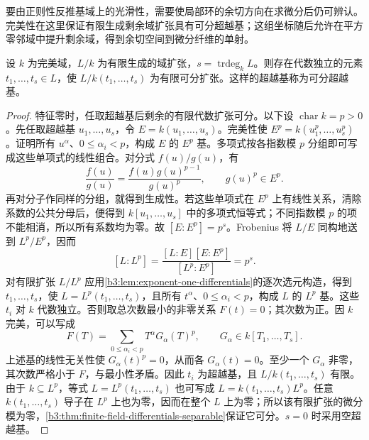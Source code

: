 要由正则性反推基域上的光滑性，需要使局部环的余切方向在求微分后仍可辨认。完美性在这里保证有限生成剩余域扩张具有可分超越基；这组坐标随后允许在平方零邻域中提升剩余域，得到余切空间到微分纤维的单射。

\begin{lemma}[可分超越基]\label{b3:lem:perfect-field-separating-basis}
	设 \(k\) 为完美域，\(L/k\) 为有限生成的域扩张，\(s=\operatorname{trdeg}_kL\)。则存在代数独立的元素 \(t_1,\ldots,t_s\in L\)，使 \(L/k(t_1,\ldots,t_s)\) 为有限可分扩张。这样的超越基称为可分超越基。
\end{lemma}
\begin{proof}
	特征零时，任取超越基后剩余的有限代数扩张可分。以下设 \(\operatorname{char}k=p>0\)。先任取超越基 \(u_1,\ldots,u_s\)，令 \(E=k(u_1,\ldots,u_s)\)。完美性使 \(E^p=k(u_1^p,\ldots,u_s^p)\)。证明所有 \(u^\alpha\)、\(0\le\alpha_i<p\)，构成 \(E\) 的 \(E^p\) 基。多项式按各指数模 \(p\) 分组即可写成这些单项式的线性组合。对分式 \(f(u)/g(u)\)，有
	\[
		\frac{f(u)}{g(u)} =\frac{f(u)g(u)^{p-1}}{g(u)^p}, \qquad g(u)^p\in E^p.
	\]
	再对分子作同样的分组，就得到生成性。若这些单项式在 \(E^p\) 上有线性关系，清除系数的公共分母后，便得到 \(k[u_1,\ldots,u_s]\) 中的多项式恒等式；不同指数模 \(p\) 的项不能相消，所以所有系数均为零。故 \([E:E^p]=p^s\)。Frobenius 将 \(L/E\) 同构地送到 \(L^p/E^p\)，因而
	\[
		[L:L^p] =\frac{[L:E][E:E^p]}{[L^p:E^p]} =p^s.
	\]
	对有限扩张 \(L/L^p\) 应用\cref{b3:lem:exponent-one-differentials}的逐次选元构造，得到 \(t_1,\ldots,t_s\)，使 \(L=L^p(t_1,\ldots,t_s)\)，且所有 \(t^\alpha\)、\(0\le\alpha_i<p\)，构成 \(L\) 的 \(L^p\) 基。这些 \(t_i\) 对 \(k\) 代数独立。否则取总次数最小的非零关系 \(F(t)=0\)；其次数为正。因 \(k\) 完美，可以写成
	\[
		F(T)=\sum_{0\le\alpha_i<p}T^\alpha G_\alpha(T)^p, \qquad G_\alpha\in k[T_1,\ldots,T_s].
	\]
	上述基的线性无关性使 \(G_\alpha(t)^p=0\)，从而各 \(G_\alpha(t)=0\)。至少一个 \(G_\alpha\) 非零，其次数严格小于 \(F\)，与最小性矛盾。因此 \(t_i\) 为超越基，且 \(L/k(t_1,\ldots,t_s)\) 有限。由于 \(k\subseteq L^p\)，等式 \(L=L^p(t_1,\ldots,t_s)\) 也可写成 \(L=k(t_1,\ldots,t_s)L^p\)。任意 \(k(t_1,\ldots,t_s)\) 导子在 \(L^p\) 上也为零，因而在整个 \(L\) 上为零；所以该有限扩张的微分模为零，\cref{b3:thm:finite-field-differentials-separable}保证它可分。\(s=0\) 时采用空超越基。
\end{proof}

